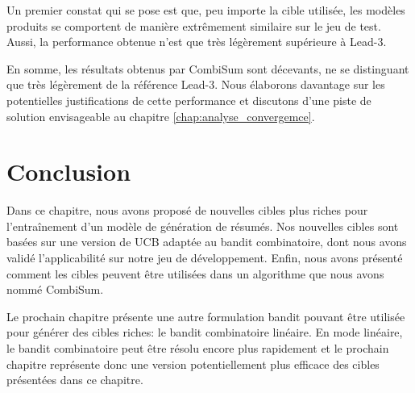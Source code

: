 Un premier constat qui se pose est que, peu importe la cible 
utilisée, les modèles produits se comportent de manière 
extrêmement similaire sur le jeu de test.
Aussi, la performance obtenue n'est que 
très légèrement supérieure à Lead-3.

En somme, les résultats obtenus par CombiSum sont décevants,
ne se distinguant que très légèrement de la référence Lead-3.
Nous élaborons davantage sur les potentielles 
justifications de cette performance et discutons 
d'une piste de solution envisageable au chapitre \ref{chap:analyse_convergemce}.

\section{Conclusion}

Dans ce chapitre, nous avons proposé de nouvelles cibles plus riches
pour l'entraînement d'un modèle de génération de résumés.
Nos nouvelles cibles sont basées sur une version 
de UCB adaptée au bandit combinatoire, dont nous avons validé 
l'applicabilité sur notre jeu de développement.
Enfin, nous avons présenté comment les cibles 
peuvent être utilisées dans un algorithme 
que nous avons nommé CombiSum.

Le prochain chapitre présente une autre 
formulation bandit pouvant être utilisée pour 
générer des cibles riches: le bandit combinatoire 
linéaire.
En mode linéaire, le bandit combinatoire peut être résolu 
encore plus rapidement et le prochain chapitre 
représente donc une version potentiellement plus 
efficace des cibles présentées dans ce chapitre.